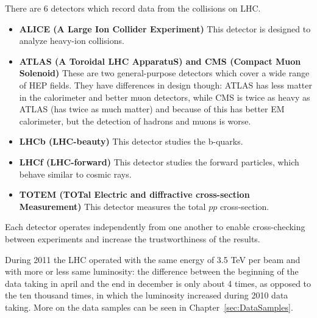 There are 6 detectors which record data from the collisions on LHC.
\begin{itemize}
\item {\bfseries ALICE (A Large Ion Collider Experiment)} This detector is designed to analyze heavy-ion collisions.
\item {\bfseries ATLAS (A Toroidal LHC ApparatuS) and CMS (Compact Muon Solenoid)} These are two general-purpose detectors which cover a wide range of HEP fields. They have differences in design though: ATLAS has less matter in the calorimeter and better muon detectors, while CMS is twice as heavy as ATLAS (has twice as much matter) and because of this has better EM calorimeter, but the detection of hadrons and muons is worse.
\item {\bfseries LHCb (LHC-beauty)} This detector studies the b-quarks.
\item {\bfseries LHCf (LHC-forward)} This detector studies the forward particles, which behave similar to cosmic rays.
\item {\bfseries TOTEM (TOTal Electric and diffractive cross-section Measurement)} This detector measures the total $pp$ cross-section.
\end{itemize}

Each detector operates independently from one another to enable cross-checking between experiments and increase the trustworthiness of the results.

During 2011 the LHC operated with the same energy of 3.5 TeV per beam and with more or less same luminosity: the difference between the beginning of the data taking in april and the end in december is only about 4 times, as opposed to the ten thousand times, in which the luminosity increased during 2010 data taking. More on the data samples can be seen in Chapter~\ref{sec:DataSamples}.

